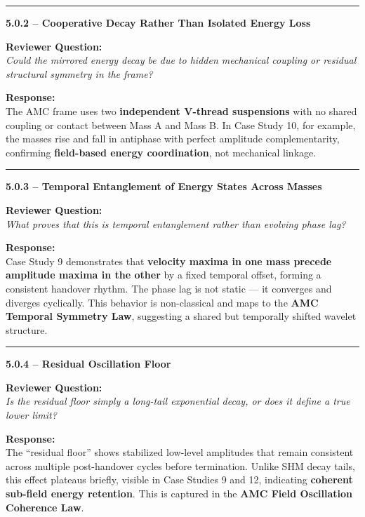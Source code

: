 \documentclass[10pt,aps,pre,onecolumn,superscriptaddress,notitlepage]{revtex4-2}
\begin{document}
\vspace{1em}
\hrule
\vspace{1em}

\textbf{5.0.2 – Cooperative Decay Rather Than Isolated Energy Loss}

\textbf{Reviewer Question:} \\
\textit{Could the mirrored energy decay be due to hidden mechanical coupling or residual structural symmetry in the frame?}

\textbf{Response:} \\
The AMC frame uses two \textbf{independent V-thread suspensions} with no shared coupling or contact between Mass A and Mass B. In Case Study 10, for example, the masses rise and fall in antiphase with perfect amplitude complementarity, confirming \textbf{field-based energy coordination}, not mechanical linkage.

\vspace{1em}
\hrule
\vspace{1em}

\textbf{5.0.3 – Temporal Entanglement of Energy States Across Masses}

\textbf{Reviewer Question:} \\
\textit{What proves that this is temporal entanglement rather than evolving phase lag?}

\textbf{Response:} \\
Case Study 9 demonstrates that \textbf{velocity maxima in one mass precede amplitude maxima in the other} by a fixed temporal offset, forming a consistent handover rhythm. The phase lag is not static — it converges and diverges cyclically. This behavior is non-classical and maps to the \textbf{AMC Temporal Symmetry Law}, suggesting a shared but temporally shifted wavelet structure.

\vspace{1em}
\hrule
\vspace{1em}

\textbf{5.0.4 – Residual Oscillation Floor}

\textbf{Reviewer Question:} \\
\textit{Is the residual floor simply a long-tail exponential decay, or does it define a true lower limit?}

\textbf{Response:} \\
The “residual floor” shows stabilized low-level amplitudes that remain consistent across multiple post-handover cycles before termination. Unlike SHM decay tails, this effect plateaus briefly, visible in Case Studies 9 and 12, indicating \textbf{coherent sub-field energy retention}. This is captured in the \textbf{AMC Field Oscillation Coherence Law}.
\end{document}
